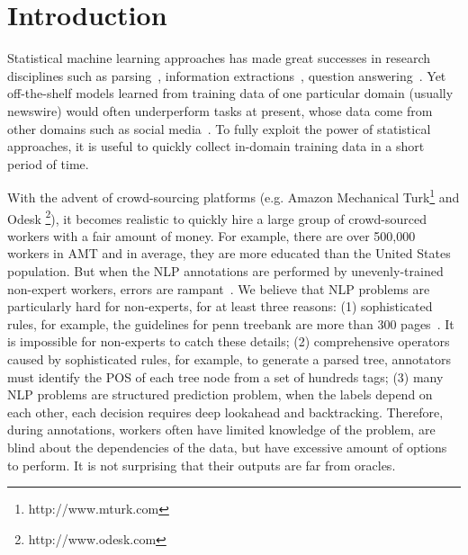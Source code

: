 \section{Introduction}
Statistical machine learning approaches has made great successes in research disciplines such as parsing~\cite{klein2003accurate}, information extractions~\cite{banko2007open}, question answering~\cite{kwok2001scaling}. Yet off-the-shelf models learned from training data of one particular domain (usually newswire) would often underperform tasks at present, whose data come from other domains such as social media~\cite{zhang2013adaptive}. To fully exploit the power of statistical approaches, it is useful to quickly collect in-domain training data in a short period of time.

With the advent of crowd-sourcing platforms (e.g. Amazon Mechanical Turk\footnote{http://www.mturk.com} and Odesk \footnote{http://www.odesk.com}), it becomes realistic to quickly hire a large group of crowd-sourced workers with a fair amount of money. For example, there are over 500,000 workers in AMT and in average, they are more educated than the United States population. But when the NLP annotations are performed by unevenly-trained non-expert workers, errors are rampant~\cite{snow2008cheap}. We believe that NLP problems are particularly hard for non-experts, for at least three reasons: (1) sophisticated rules, for example, the guidelines for penn treebank are more than 300 pages~\cite{bies1995bracketing}. It is impossible for non-experts to catch these details; (2) comprehensive operators caused by sophisticated rules, for example, to generate a parsed tree, annotators must identify the POS of each tree node from a set of hundreds tags; (3) many NLP problems are structured prediction problem, when the labels depend on each other, each decision requires deep lookahead and backtracking. Therefore,
during annotations, workers often have limited knowledge of the problem, are blind about the dependencies of the data, but have excessive amount of options to perform. It is not surprising that their outputs are far from oracles.

